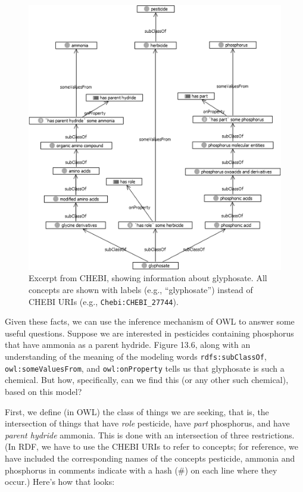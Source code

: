 \begin{figure}
\centering
\includegraphics[width=5in]{media/ch14/f14-06.png}
\caption{Excerpt from CHEBI, showing information about glyphosate. All concepts
are shown with labels (e.g., ``glyphosate'') instead of CHEBI URIs
(e.g., \texttt{Chebi:CHEBI\_27744}).
}
\label{fig:ch14.06}
\end{figure}

Given these facts, we can use the inference mechanism of OWL to answer
some useful questions. Suppose we are interested in pesticides
containing phosphorus that have ammonia as a parent hydride. Figure
13.6, along with an understanding of the meaning of the modeling words
\texttt{rdfs:subClassOf}, \texttt{owl:someValuesFrom}, and \texttt{owl:onProperty} tells us that
glyphosate is such a chemical. But how, specifically, can we find this
(or any other such chemical), based on this model?

First, we define (in OWL) the class of things we are seeking, that is,
the intersection of things that have \textit{role} pesticide, have \textit{part}
phosphorus, and have \textit{parent hydride} ammonia. This is done with an
intersection of three restrictions. (In RDF, we have to use the CHEBI
URIs to refer to concepts; for reference, we have included the
corresponding names of the concepts pesticide, ammonia and
phosphorus in comments indicate with a hash (\#) on each line where they
occur.) Here's how that looks:

